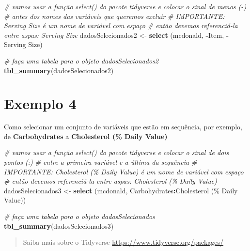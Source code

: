 \documentclass[
]{book}
\newenvironment{Shaded}{\begin{snugshade}}{\end{snugshade}}
\newcommand{\AttributeTok}[1]{\textcolor[rgb]{0.13,0.29,0.53}{#1}}
\newcommand{\CommentTok}[1]{\textcolor[rgb]{0.56,0.35,0.01}{\textit{#1}}}
\newcommand{\FunctionTok}[1]{\textcolor[rgb]{0.13,0.29,0.53}{\textbf{#1}}}
\newcommand{\NormalTok}[1]{#1}
\newcommand{\OtherTok}[1]{\textcolor[rgb]{0.56,0.35,0.01}{#1}}
\newcommand{\SpecialCharTok}[1]{\textcolor[rgb]{0.81,0.36,0.00}{\textbf{#1}}}
\newcommand{\StringTok}[1]{\textcolor[rgb]{0.31,0.60,0.02}{#1}}
\begin{document}
\begin{Shaded}
\begin{Highlighting}[]
\CommentTok{\# vamos usar a função select() do pacote tidyverse e colocar o sinal de menos ({-})}
\CommentTok{\# antes dos nomes das variáveis que queremos excluir}
\CommentTok{\# IMPORTANTE: Serving Size é um nome de variável com espaço }
\CommentTok{\# então devemos referenciá{-}la entre aspas: \textasciigrave{}Serving Size\textasciigrave{}}
\NormalTok{dadosSelecionados2 }\OtherTok{\textless{}{-}} \FunctionTok{select}\NormalTok{ (mcdonald, }\SpecialCharTok{{-}}\NormalTok{Item, }\SpecialCharTok{{-}}\StringTok{\textasciigrave{}}\AttributeTok{Serving Size}\StringTok{\textasciigrave{}}\NormalTok{)}

\CommentTok{\# faça uma tabela para o objeto dadosSelecionados2}
\FunctionTok{tbl\_summary}\NormalTok{(dadosSelecionados2)}
\end{Highlighting}
\end{Shaded}

\section{Exemplo 4}\label{exemplo-4}

Como selecionar um conjunto de variáveis que estão em sequência, por exemplo, de \textbf{Carbohydrates} a \textbf{Cholesterol (\% Daily Value)}

\begin{Shaded}
\begin{Highlighting}[]
\CommentTok{\# vamos usar a função select() do pacote tidyverse e colocar o sinal de dois pontos (:)}
\CommentTok{\# entre a primeira variável e a última da sequência }
\CommentTok{\# IMPORTANTE: Cholesterol (\% Daily Value) é um nome de variável com espaço }
\CommentTok{\# então devemos referenciá{-}la entre aspas: \textasciigrave{}Cholesterol (\% Daily Value)\textasciigrave{}}
\NormalTok{dadosSelecionados3 }\OtherTok{\textless{}{-}} \FunctionTok{select}\NormalTok{ (mcdonald, Carbohydrates}\SpecialCharTok{:}\StringTok{\textasciigrave{}}\AttributeTok{Cholesterol (\% Daily Value)}\StringTok{\textasciigrave{}}\NormalTok{)}

\CommentTok{\# faça uma tabela para o objeto dadosSelecionados}
\FunctionTok{tbl\_summary}\NormalTok{(dadosSelecionados3)}
\end{Highlighting}
\end{Shaded}

\begin{quote}
Saiba mais sobre o Tidyverse \url{https://www.tidyverse.org/packages/}
\end{quote}
\end{document}
